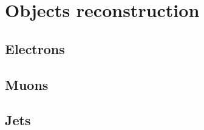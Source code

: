 \clearpage{\pagestyle{empty}\cleardoublepage}

\chapter{Objects reconstruction}\label{chap:objects}

\section{Electrons}\label{sec:electrons}
\section{Muons}\label{sec:muons}
\section{Jets}\label{sec:jets}

